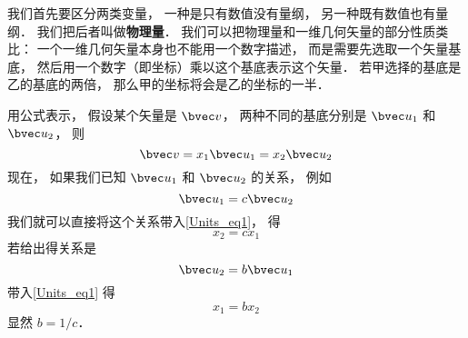 

我们首先要区分两类变量， 一种是只有数值没有量纲， 另一种既有数值也有量纲． 我们把后者叫做\textbf{物理量}． 我们可以把物理量和一维几何矢量的部分性质类比： 一个一维几何矢量本身也不能用一个数字描述， 而是需要先选取一个矢量基底， 然后用一个数字（即坐标）乘以这个基底表示这个矢量． 若甲选择的基底是乙的基底的两倍， 那么甲的坐标将会是乙的坐标的一半．

用公式表示， 假设某个矢量是 $\bvec v$， 两种不同的基底分别是 $\bvec u_1$ 和 $\bvec u_2$， 则
\begin{equation}\label{Units_eq1}
\bvec v = x_1 \bvec u_1 = x_2 \bvec u_2
\end{equation}
现在， 如果我们已知 $\bvec u_1$ 和 $\bvec u_2$ 的关系， 例如
\begin{equation}\label{Units_eq2}
\bvec u_1 = c \bvec u_2
\end{equation}
我们就可以直接将这个关系带入\autoref{Units_eq1}， 得
\begin{equation}
x_2 = c x_1
\end{equation}
若给出得关系是
\begin{equation}
\bvec u_2 = b\bvec u_1
\end{equation}
带入\autoref{Units_eq1} 得
\begin{equation}
x_1 = b x_2
\end{equation}
显然 $b = 1/c$．
